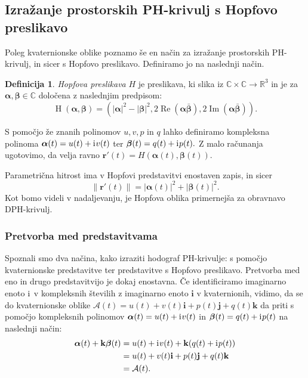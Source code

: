 \documentclass[12pt,a4paper,twoside]{article}
\newcommand{\iu}{\mathrm{i}\mkern1mu} %
\theoremstyle{definition} %
\newtheorem{definicija}{Definicija}[section]
\theoremstyle{plain} %
\theoremstyle{primerstyle}
\numberwithin{equation}{section}  %
\newcommand{\R}{\mathbb R}
\renewcommand{\C}{\mathbb C}
\newcommand{\rV}{\mathbf{r}}
\newcommand{\iV}{\mathbf{i}}
\newcommand{\jV}{\mathbf{j}}
\newcommand{\kV}{\mathbf{k}}
\newcommand{\AQ}{\mathcal{A}}
\newcommand{\balpha}{\boldsymbol \alpha}
\newcommand{\bbeta}{\boldsymbol \beta}
\DeclareMathOperator{\hopf}{H}
\DeclareMathOperator{\ReC}{Re}
\DeclareMathOperator{\ImC}{Im}
\begin{document}
\subsection{Izražanje prostorskih PH-krivulj s Hopfovo preslikavo}
\label{hopf_poglavje}

Poleg kvaternionske oblike poznamo še en način za izražanje prostorskih PH-krivulj, in sicer s Hopfovo preslikavo. Definiramo jo na naslednji način.
\begin{definicija}
	\label{hopf_def}
	\emph{Hopfova preslikava} $H$ je preslikava, ki slika iz $\C \times \C \to \R^3$ in je za $\balpha, \bbeta \in \C$ določena z naslednjim predpisom:
	\begin{equation}
		\label{hopf}
		\hopf(\balpha, \bbeta)=(|\balpha|^2-|\bbeta|^2,2\ReC(\balpha \bar{\bbeta}),2\ImC(\balpha \bar{\bbeta})).
	\end{equation}
\end{definicija}
S pomočjo že znanih polinomov $u,v,p$ in $q$ lahko definiramo kompleksna polinoma $\balpha(t)=u(t)+\iu v(t)$ ter $\bbeta(t)=q(t)+\iu p(t).$ Z malo računanja ugotovimo, da velja ravno $\rV'(t)=H(\balpha(t),\bbeta(t)).$

Parametrična hitrost ima v Hopfovi predstavitvi enostaven zapis, in sicer $$\lVert \rV'(t) \rVert=|\balpha(t)|^2+|\bbeta(t)|^2.$$ Kot bomo videli v nadaljevanju, je Hopfova oblika primernejša za obravnavo DPH-krivulj.

\subsubsection{Pretvorba med predstavitvama}

Spoznali smo dva načina, kako izraziti hodograf PH-krivulje: s pomočjo kvaternionske predstavitve ter predstavitve s Hopfovo preslikavo. Pretvorba med eno in drugo predstavitvijo je dokaj enostavna. Če identificiramo imaginarno enoto $\iu$ v kompleksnih številih z imaginarno enoto $\iV$ v kvaternionih, vidimo, da se do kvaternionske oblike $\AQ(t)=u(t)+v(t)\iV+p(t)\jV+q(t)\kV$ da priti s pomočjo kompleksnih polinomov $\balpha(t)=u(t)+\iu v(t)$ in $\bbeta(t)=q(t)+\iu p(t)$ na naslednji način:
\begin{align}
	\balpha(t)+\kV\bbeta(t) &= u(t)+\iu v(t)+\kV(q(t)+ \iu p(t)) \nonumber \\
	&=u(t)+v(t)\iV + p(t)\jV+ q(t)\kV \label{comp_to_quat} \\
	&= \AQ(t).\nonumber
\end{align}
\end{document}
